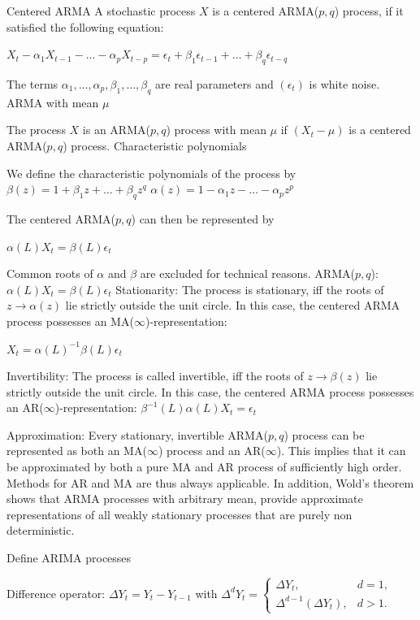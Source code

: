 Centered ARMA
A stochastic process \(X\) is a centered ARMA(\(p, q\)) process, if it satisfied the following equation:

\(X_t - \alpha_1 X_{t - 1} - \dots - \alpha_p X_{t - p} = \epsilon_t + \beta_1 \epsilon_{t - 1} + \dots + \beta_q \epsilon_{t - q}\)

The terms \(\alpha_1, \dots, \alpha_p, \beta_1, \dots, \beta_q\) are real parameters and \((\epsilon_t)\) is white noise.
ARMA with mean \(\mu\)

The process \(X\) is an ARMA(\(p, q\)) process with mean \(\mu\) if \((X_t - \mu)\) is a centered ARMA(\(p, q\)) process.
Characteristic polynomials

We define the characteristic polynomials of the process by
\(\beta(z) = 1 + \beta_1 z + \dots + \beta_q z^q\)
\(\alpha(z) = 1 - \alpha_1 z - \dots - \alpha_p z^p\)

The centered ARMA(\(p, q\)) can then be represented by

\(\alpha(L)X_t = \beta(L) \epsilon_t\)

Common roots of \(\alpha\) and \(\beta\) are excluded for technical reasons.
ARMA(\(p, q\)): \(\alpha(L)X_t = \beta(L) \epsilon_t\)
Stationarity:
The process is stationary, iff the roots of \(z \rightarrow \alpha(z)\) lie strictly outside the unit circle.
In this case, the centered ARMA process possesses an MA(\(\infty\))-representation:

\(X_t = \alpha(L)^{-1} \beta(L) \epsilon_t\)

Invertibility:
The process is called invertible, iff the roots of \(z \rightarrow \beta(z)\) lie strictly outside the unit circle.
In this case, the centered ARMA process possesses an AR(\(\infty\))-representation:
\(\beta^{-1}(L) \alpha(L) X_t = \epsilon_t\)

Approximation:
Every stationary, invertible ARMA(\(p, q\)) process can be represented as both an MA(\(\infty\)) process and an AR(\(\infty\)).
This implies that it can be approximated by both a pure MA and AR process of sufficiently high order.
Methods for AR and MA are thus always applicable.
In addition, Wold's theorem shows that ARMA processes with arbitrary mean, 
provide approximate representations of all weakly stationary processes that are purely non deterministic.


Define ARIMA processes


Difference operator:
\(\Delta Y_t = Y_t - Y_{t - 1}\) with \(\Delta^d Y_t = \begin{cases} \Delta Y_t, & d = 1, \\ \Delta^{d - 1} (\Delta Y_t), & d > 1. \end{cases}\)

